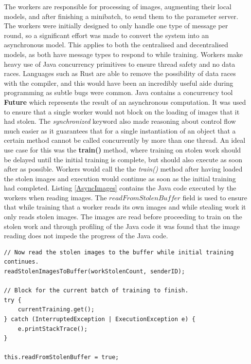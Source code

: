 \documentclass[12pt]{article}
\begin{document}
The workers are responsible for processing of images, augmenting their local models, and after finishing a minibatch, to send them to the parameter server. The workers were initially designed to only handle one type of message per round, so a significant effort was made to convert the system into an asynchronous model. This applies to both the centralised and decentralised models, as both have message types to respond to while training.
\newline
\newline
Workers make heavy use of Java concurrency primitives to ensure thread safety and no data races. Languages such as Rust are able to remove the possibility of data races with the compiler, and this would have been an incredibly useful aide during programming as subtle bugs were common. Java contains a concurrency tool \textbf{Future} which represents the result of an asynchronous computation. It was used to ensure that a single worker would not block on the loading of images that it had stolen. The \textit{synchronized} keyword also made reasoning about control flow much easier as it guarantees that for a single instantiation of an object that a certain method cannot be called concurrently by more than one thread. An ideal use case for this was the \textbf{train()} method, where training on stolen work should be delayed until the initial training is complete, but should also execute as soon after as possible. Workers would call the the \textit{train()} method after having loaded the stolen images and execution would continue as soon as the initial training had completed. Listing \ref{AsyncImages} contains the Java code executed by the workers when reading images. The $readFromStolenBuffer$ field is used to ensure that while training that a worker reads its own images and while stealing work it only reads stolen images. The images are read before proceeding to train on the stolen work and through profiling of the Java code it was found that the image reading does not impede the progress of the Java code.

\begin{lstlisting}[caption={Image Reading},label=AsyncImages]
// Now read the stolen images to the buffer while initial training continues.
readStolenImagesToBuffer(workStolenCount, senderID);

// Block for the current batch of training to finish.
try {
    currentTraining.get();
} catch (InterruptedException | ExecutionException e) {
    e.printStackTrace();
}

this.readFromStolenBuffer = true;
\end{lstlisting}
\end{document}
